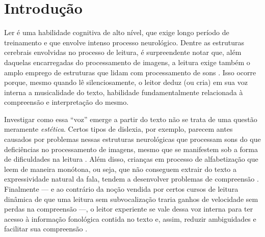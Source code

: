 \documentclass[a4paper,11pt,titlepage,singlespacing]{article}
\newcommand\todo[1]{\textcolor{red}{#1}}
\begin{document}



\newpage


\thispagestyle{empty}
\newpage
{}


\renewcommand{\contentsname}{Sumário}
\tableofcontents

\newpage

\section{Introdução}

\noindent Ler é uma habilidade cognitiva de alto nível, que exige longo período de treinamento e que envolve intenso processo neurológico. Dentre as estruturas cerebrais envolvidas no processo de leitura, é surpreendente notar que, além daquelas encarregadas do processamento de imagens, a leitura exige também o amplo emprego de estruturas que lidam com processamento de sons \cite[cap.7]{seidenberg2017}. Isso ocorre porque, mesmo quando lê silenciosamente, o leitor deduz (ou cria) em sua voz interna a musicalidade do texto, habilidade fundamentalmente relacionada à compreensão e interpretação do mesmo.

Investigar como essa ``voz'' emerge a partir do texto não se trata de uma questão meramente \textit{estética}. Certos tipos de dislexia, por exemplo, parecem antes causados por problemas nessas estruturas neurológicas que processam sons do que deficiências no processamento de imagens, mesmo que se manifestem sob a forma de dificuldades na  leitura \cite[cap.8]{seidenberg2017}. Além disso, crianças em processo de alfabetização que leem de maneira monótona, ou seja, que não conseguem extrair do texto a expressividade natural da fala, tendem a desenvolver problemas de compreensão \cite{bessemans2017}. Finalmente — e ao contrário da noção vendida por certos cursos de leitura dinâmica de que uma leitura sem subvocalização traria ganhos de velocidade sem perdas na compreensão —, o leitor experiente se vale dessa voz interna para ter acesso à informação fonológica contida no texto e, assim, reduzir ambiguidades e facilitar sua compreensão \cite[cap.4]{seidenberg2017}.
\end{document}
